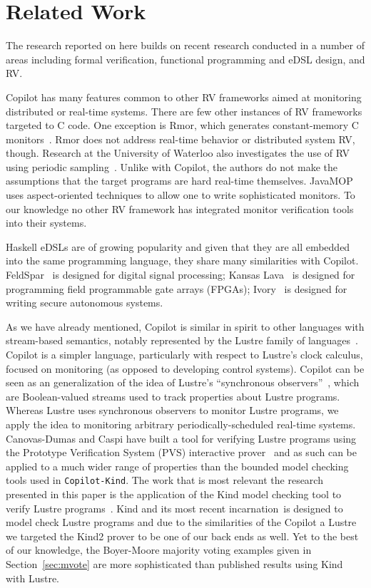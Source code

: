 \section{Related Work}\label{sec:related}
The research reported on here builds on recent  research conducted in a number
of areas including formal verification, functional programming and
eDSL design, and RV.  

Copilot has many features common to other RV frameworks aimed at
 monitoring distributed or real-time systems.  
There are few other instances of RV frameworks targeted to C code.  One exception is {\sc
  Rmor}, which generates constant-memory C monitors~\cite{havelundc}.  {\sc
  Rmor} does not address real-time behavior or distributed system RV,
though.   Research at the University of Waterloo also investigates the use of
 RV using  periodic sampling~\cite{sampling}.  Unlike with Copilot, the authors
do not make the assumptions that the target programs are hard real-time
themselves.  JavaMOP~\cite{javamop}  uses aspect-oriented techniques
to allow one to write sophisticated monitors. To our knowledge no
other RV framework has integrated monitor verification tools into
their systems. 

Haskell eDSLs are of growing popularity and given that they are all
embedded into the same programming language, they share many
similarities with Copilot. FeldSpar~\cite{feldspar} is designed for digital signal
processing;  Kansas Lava~\cite{Gill:14:DSLs} is designed for
programming  field programmable gate arrays (FPGAs);
Ivory~\cite{pike-plpv14} is designed for writing secure autonomous
systems. 

  As we have already mentioned, Copilot is similar in spirit to other languages with stream-based semantics,
notably represented by the Lustre family of languages~\cite{lustre-intro}.
Copilot is a simpler language, particularly with respect to Lustre's clock
calculus, focused on monitoring (as opposed to developing control systems).
Copilot can be seen as an generalization of the idea of Lustre's ``synchronous
observers''~\cite{Halbwachs93}, which are Boolean-valued streams used to track
properties about Lustre programs.  Whereas Lustre uses synchronous observers to
monitor Lustre programs, we apply the idea to monitoring arbitrary
periodically-scheduled real-time systems. Canovas-Dumas and Caspi have
built a tool for verifying Lustre programs using the Prototype
Verification System (PVS) interactive prover~\cite{Canovas-Dumas:2000}
and as such can be applied to a much wider range of properties than
the bounded model checking tools used in \texttt{Copilot-Kind}. 
The work that is most relevant  the research presented in this paper
is the application of  the Kind model checking tool to verify Lustre
programs~\cite{Hagen08}. 
Kind and its most recent incarnation~\cite{kind2}is designed to model
check Lustre programs and due to the  similarities of the Copilot a
Lustre we targeted the Kind2 prover to be one of our back ends as
well.  Yet to the best of our knowledge, the Boyer-Moore majority
voting examples given in Section~\ref{sec:mvote} are more
sophisticated than published results using Kind with Lustre. 
  


